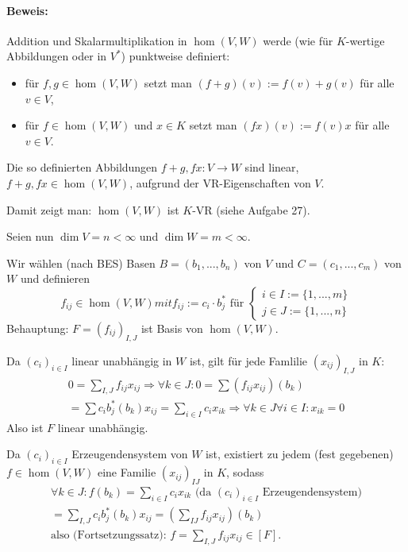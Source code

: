 \paragraph{Beweis:}
	Addition und Skalarmultiplikation in $\hom (V,W)$ werde (wie für $K$-wertige Abbildungen oder in $V^*$) punktweise definiert:
	\begin{itemize}
		\item für $f,g \in \hom (V,W)$ setzt man $(f+g)(v) := f(v) + g(v)$ für alle $v\in V$,
		\item für $f\in \hom (V,W)$ und $x\in K$ setzt man $(fx)(v) := f(v)x$ für alle $v\in V$.
	\end{itemize}
	Die so definierten Abbildungen $f+g,fx: V\to W$ sind linear, $f+g, fx\in \hom (V,W)$, aufgrund der VR-Eigenschaften von $V$.
	
	Damit zeigt man: $\hom (V,W)$ ist $K$-VR (siehe Aufgabe 27).
	
	Seien nun $\dim V = n < \infty$ und $\dim W = m < \infty$.
	
	Wir wählen (nach BES) Basen $B = (b_1,...,b_n)$ von $V$ und $C=(c_1,...,c_m)$ von $W$ und definieren
		\begin{equation*}
			f_{ij}\in \hom (V,W) mit f_{ij}:= c_i\cdot b_j^* \text{ für } 
				\begin{cases}
					i\in I := \{1,...,m\}\\
					j\in J := \{1,...,n\}
				\end{cases}
		\end{equation*}
	Behauptung: $F=(f_{ij})_{I,J}$ ist Basis von $\hom (V,W)$.
	
	Da $(c_i)_{i\in I}$ linear unabhängig in $W$ ist, gilt für jede Famlilie $(x_{ij})_{I,J}$ in $K$:
		\begin{gather*}
			0 = \sum_{I,J} f_{ij}x_{ij} \Rightarrow \forall k \in J: 0 = \sum (f_{ij}x_{ij})(b_k)\\
			= \sum c_i b_j^* (b_k) x_{ij} = \sum_{i\in I} c_ix_{ik} \Rightarrow \forall k\in J\forall i\in I:x_{ik} = 0
		\end{gather*}
	Also ist $F$ linear unabhängig.
	
	Da $(c_i)_{i\in I}$ Erzeugendensystem von $W$ ist, existiert zu jedem (fest gegebenen) $f\in\hom (V,W)$ eine Familie $(x_{ij})_{IJ}$ in $K$, sodass
		\begin{gather*}
		\forall k\in J: f(b_k) = \sum_{i\in I} c_i x_{ik} \text{ (da $(c_i)_{i\in I}$ Erzeugendensystem)}\\
		= \sum_{I,J}c_ib_j^*(b_k)x_{ij} = \left(\sum_{IJ} f_{ij}x_{ij}\right)(b_k)\\
		\text{also (Fortsetzungssatz): } f=\sum_{I,J}f_{ij}x_{ij} \in [F].
		\end{gather*}
	
